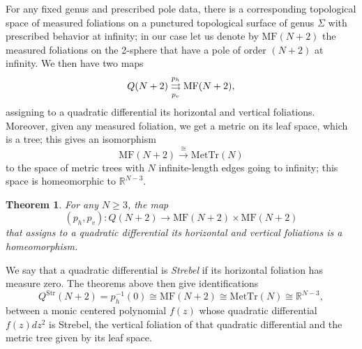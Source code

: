 \documentclass[11pt,a4paper]{amsart}
\newtheorem{theorem}{Theorem}
\theoremstyle{definition}
\begin{document}
For any fixed genus and prescribed pole data, there is a corresponding topological space of measured foliations on a punctured topological surface of genus $\Sigma$ with prescribed behavior at infinity; in our case let us denote by $\mathrm{MF}(N+2)$ the measured foliations on the 2-sphere that have a pole of order $(N+2)$ at infinity. We then have two maps
\[ Q(N+2) \overunderset{p_h}{p_v}{\rightrightarrows} \mathrm{MF}(N+2), \]
assigning to a quadratic differential its horizontal and vertical foliations. Moreover, given any measured foliation, we get a metric on its leaf space, which is a tree; this gives an isomorphism 
\[ \mathrm{MF}(N+2) \xrightarrow{\cong} \mathrm{MetTr}(N) \]
to the space of metric trees with $N$ infinite-length edges going to infinity; this space is homeomorphic to $\mathbb{R}^{N-3}$.
\begin{theorem}\label{thm:homeo}
    For any $N \ge 3$, the map
    \[ (p_h, p_v) \colon Q(N+2) \to \mathrm{MF}(N+2) \times  \mathrm{MF}(N+2) \]
    that assigns to a quadratic differential its horizontal and vertical foliations is a homeomorphism.
\end{theorem}

\noindent We say that a quadratic differential is \emph{Strebel} if its horizontal foliation has measure zero. The theorems above then give identifications
\[ Q^\mathrm{Str}(N+2) = p_h^{-1}(0) \cong \mathrm{MF}(N+2) \cong \mathrm{MetTr}(N) \cong \mathbb{R}^{N-3}, \]
between a monic centered polynomial $f(z)$ whose quadratic differential $f(z)dz^2$ is Strebel, the vertical foliation of that quadratic differential and the metric tree given by its leaf space.
\end{document}
